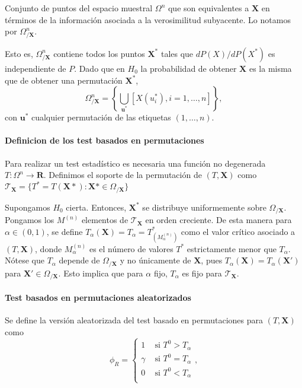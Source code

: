 \begin{definicion}
	Conjunto de puntos del espacio muestral $\Omega^n$ que son equivalentes a $\mathbf{X}$ en términos de la información asociada a la verosimilitud subyacente. Lo notamos por $\Omega^n_{/\mathbf{X}}$.
\end{definicion}

	Esto es, $\Omega^n_{/\mathbf{X}}$ contiene todos los puntos $\mathbf{X}^*$ tales que $dP(X)/dP(X^*)$ es independiente de $P$. Dado que en $H_0$ la probabilidad de obtener $\mathbf{X}$ es la misma que de obtener una permutación $\mathbf{X}^*$,
	\[ 
		\Omega^n_{/\mathbf{X}} = 
			\left\lbrace
				\underset{\mathbf{u}^*}{\bigcup}
					[ X(u_i^*), i = 1, \dots, n ]
			\right\rbrace ,
	\]
	con $\mathbf{u}^*$ cualquier permutación de las etiquetas $(1, \dots, n)$.

\paragraph{Definicion de los test basados en permutaciones}
\begin{definicion}
	Para realizar un test estadístico es necesaria una función no degenerada $T: \Omega^n \rightarrow \mathbf{R}$. Definimos el soporte de la permutación de $(T, \mathbf{X})$ como $\mathcal{T}_\mathbf{X} = \{ T^* = T(\mathbf{X}*): \mathbf{X}* \in \Omega_{/\mathbf{X}}\}$ 
\end{definicion}	

	Supongamos $H_0$ cierta. Entonces, $\mathbf{X}^*$ se distribuye uniformemente sobre $\Omega_{/\mathbf{X}}$. Pongamos los $M^{(n)}$ elementos de $\mathcal{T}_\mathbf{X}$ en orden creciente. De esta manera para $\alpha \in (0,1)$, se define $T_\alpha(\mathbf{X}) = T_\alpha = T^*_{(M^{(n)}_\alpha)}$ como el valor crítico asociado a $(T, \mathbf{X})$, donde $M^{(n)}_\alpha$ es el número de valores $T^*$ estrictamente menor que $T_\alpha$. Nótese que $T_\alpha$ depende de $\Omega_{/\mathbf{X}}$ y no únicamente de $\mathbf{X}$, pues $T_\alpha(\mathbf{X}) = T_\alpha(\mathbf{X}')$ para $\mathbf{X}' \in \Omega_{/\mathbf{X}}$. Esto implica que para $\alpha$ fijo, $T_\alpha$ es fijo para $\mathcal{T}_\mathbf{X}$.
	
\paragraph{Test basados en permutaciones aleatorizados}

	Se define la versión aleatorizada del test basado en permutaciones para $(T, \mathbf{X})$ como 
	\[ 
		\phi_R = \left\lbrace \begin{array}{cc}
			1 		& \text{ si } T^0 > T_\alpha \\
			\gamma 	& \text{ si } T^0 = T_\alpha \\
			0		& \text{ si } T^0 < T_\alpha \\
		\end{array} \right. ,
	\]
	
